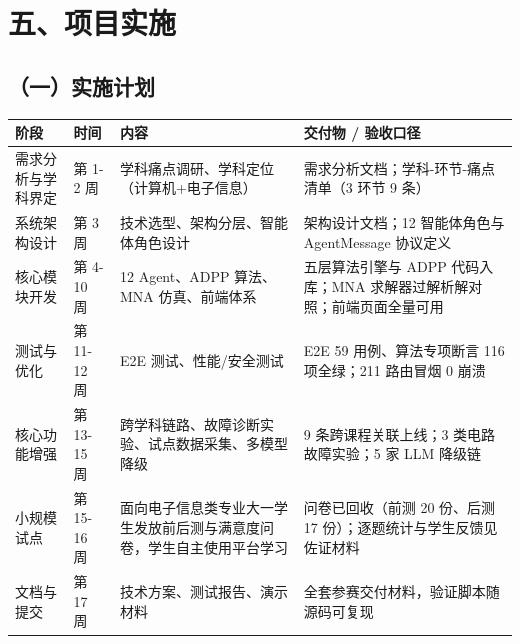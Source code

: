 \documentclass[zihao=-4,a4paper,UTF8,fontset=windows]{ctexart}
\begin{document}
\par\noindent\begin{minipage}{\linewidth}
\section{五、项目实施}
\subsection{（一）实施计划}
\par\noindent\begin{tabular}{|p{2.5cm}|p{2.5cm}|p{4.0cm}|p{4.3cm}|}
\hline
\textbf{阶段} & \textbf{时间} & \textbf{内容} & \textbf{交付物 / 验收口径} \\ \hline
需求分析与学科界定 & 第 1-2 周 & 学科痛点调研、学科定位（计算机+电子信息） & 需求分析文档；学科-环节-痛点清单（3 环节 9 条） \\ \hline
系统架构设计 & 第 3 周 & 技术选型、架构分层、智能体角色设计 & 架构设计文档；12 智能体角色与 AgentMessage 协议定义 \\ \hline
核心模块开发 & 第 4-10 周 & 12 Agent、ADPP 算法、MNA 仿真、前端体系 & 五层算法引擎与 ADPP 代码入库；MNA 求解器过解析解对照；前端页面全量可用 \\ \hline
测试与优化 & 第 11-12 周 & E2E 测试、性能/安全测试 & E2E 59 用例、算法专项断言 116 项全绿；211 路由冒烟 0 崩溃 \\ \hline
核心功能增强 & 第 13-15 周 & 跨学科链路、故障诊断实验、试点数据采集、多模型降级 & 9 条跨课程关联上线；3 类电路故障实验；5 家 LLM 降级链 \\ \hline
小规模试点 & 第 15-16 周 & 面向电子信息类专业大一学生发放前后测与满意度问卷，学生自主使用平台学习 & 问卷已回收（前测 20 份、后测 17 份）；逐题统计与学生反馈见佐证材料 \\ \hline
文档与提交 & 第 17 周 & 技术方案、测试报告、演示材料 & 全套参赛交付材料，验证脚本随源码可复现 \\ \hline
\end{tabular}\par
\end{minipage}\par
\end{document}
